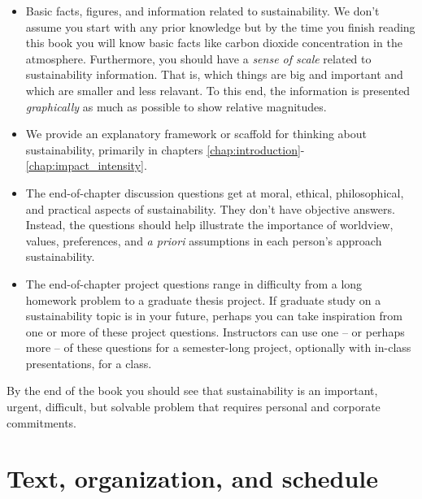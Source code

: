 {\begin{itemize}
  \item Basic facts, figures, and information related to sustainability. 
        We don't assume you start with any prior knowledge but by the time you finish 
        reading this book you will know basic facts like carbon dioxide 
        concentration in the atmosphere. 
        Furthermore, you should have a \emph{sense of scale} related to sustainability 
        information. 
        That is, which things are big and important and 
        which are smaller and less relavant. 
        To this end, the information is presented \emph{graphically} as much as possible 
        to show relative magnitudes.
        
  \item We provide an explanatory framework or scaffold for thinking about sustainability,
        primarily in chapters \ref{chap:introduction}-\ref{chap:impact_intensity}.

  \item The end-of-chapter discussion questions get at moral, ethical, philosophical,
        and practical aspects of sustainability. 
        They don't have %
        objective answers. 
        Instead, the questions should help illustrate the importance
        of worldview, values, preferences, and \emph{a priori} assumptions 
        in each person's approach sustainability. 
        
  \item The end-of-chapter project questions range in difficulty from a long
        homework problem to a graduate thesis project. 
        If graduate study on a sustainability topic is in your future, perhaps you can 
        take inspiration from one or more of these project questions. 
        Instructors can use one -- or perhaps more -- of these questions for a 
        semester-long project, optionally with in-class presentations, for a class.
      
\end{itemize}

By the end of the book you should see that sustainability is an important, 
urgent, difficult, but solvable problem that requires personal and corporate 
commitments. 


\section*{Text, organization, and schedule} 

}
